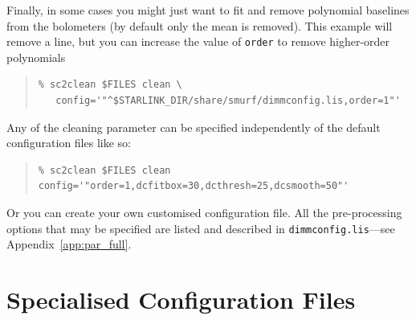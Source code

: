 \documentclass[twoside,11pt]{article}
\newcommand{\htmlref}[2]{#1}
\newcommand{\latexhtml}[2]{#1}
\newcommand{\xlabel}[1]{}
\renewcommand{\_}{\texttt{\symbol{95}}}
\newenvironment{myquote}{\begin{quote}\begin{small}}{\end{small}\end{quote}}
\newcommand{\cref}[3]{\latexhtml{#1~\ref{#2}}{\htmlref{#3}{#2}}}
\begin{document}
Finally, in some cases you might just want to fit and remove
polynomial baselines from the bolometers (by default only the mean is
removed). This example will remove a line, but you can increase the
value of \texttt{order} to remove higher-order polynomials

\begin{myquote}
\begin{verbatim}
% sc2clean $FILES clean \
   config='"^$STARLINK_DIR/share/smurf/dimmconfig.lis,order=1"'
\end{verbatim}
\end{myquote}

Any of the cleaning parameter can be specified independently of the
default configuration files like so:
\begin{myquote}
\begin{verbatim}
% sc2clean $FILES clean config='"order=1,dcfitbox=30,dcthresh=25,dcsmooth=50"'
\end{verbatim}
\end{myquote}
Or you can create your own customised configuration file. All the
pre-processing options that may be specified are listed and described
in \texttt{dimmconfig.lis}---see \cref{Appendix}{app:par_full}{here}.

\newpage
\section{\xlabel{special}Specialised Configuration Files}
\label{app:special}
\end{document}
